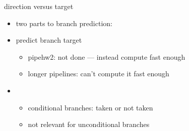 \begin{frame}{direction versus target}
    \begin{itemize}
    \item two parts to branch prediction:
    \item predict branch target
        \begin{itemize}
        \item pipehw2: not done --- instead compute fast enough
        \item longer pipelines: can't compute it fast enough
        \end{itemize}
    \item {}
        \begin{itemize}
        \item conditional branches: taken or not taken
        \item not relevant for unconditional branches
        \end{itemize}
    \end{itemize}
\end{frame}

